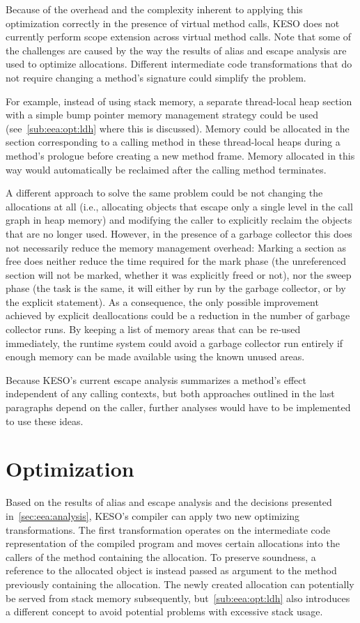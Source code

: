 			Because of the overhead and the complexity inherent to applying this optimization correctly in the presence of
			virtual method calls, KESO does not currently perform scope extension across virtual method calls. Note that some
			of the challenges are caused by the way the results of alias and escape analysis are used to optimize allocations.
			Different intermediate code transformations that do not require changing a method's signature could simplify the
			problem.

			For example, instead of using stack memory, a separate thread-local heap section with a simple bump pointer memory
			management strategy could be used (see~\cref{sub:eea:opt:ldh} where this is discussed). Memory could be allocated
			in the section corresponding to a calling method in these thread-local heaps during a method's prologue before
			creating a new method frame. Memory allocated in this way would automatically be reclaimed after the calling
			method terminates.

			A different approach to solve the same problem could be not changing the allocations at all (i.e., allocating
			objects that escape only a single level in the call graph in heap memory) and modifying the caller to explicitly
			reclaim the objects that are no longer used. However, in the presence of a garbage collector this does not
			necessarily reduce the memory management overhead: Marking a section as free does neither reduce the time required
			for the mark phase (the unreferenced section will not be marked, whether it was explicitly freed or not), nor the
			sweep phase (the task is the same, it will either by run by the garbage collector, or by the explicit statement).
			As a consequence, the only possible improvement achieved by explicit deallocations could be a reduction in the
			number of garbage collector runs. By keeping a list of memory areas that can be re-used immediately, the runtime
			system could avoid a garbage collector run entirely if enough memory can be made available using the known unused
			areas.

			Because KESO's current escape analysis summarizes a method's effect independent of any calling contexts, but both
			approaches outlined in the last paragraphs depend on the caller, further analyses would have to be implemented to
			use these ideas.

	\section{Optimization}
		\label{sec:eea:opt}
		Based on the results of alias and escape analysis and the decisions presented in~\cref{sec:eea:analysis}, KESO's
		compiler can apply two new optimizing transformations. The first transformation operates on the intermediate code
		representation of the compiled program and moves certain allocations into the callers of the method containing the
		allocation. To preserve soundness, a reference to the allocated object is instead passed as argument to the method
		previously containing the allocation. The newly created allocation can potentially be served from stack memory
		subsequently, but~\cref{sub:eea:opt:ldh} also introduces a different concept to avoid potential problems with
		excessive stack usage.

